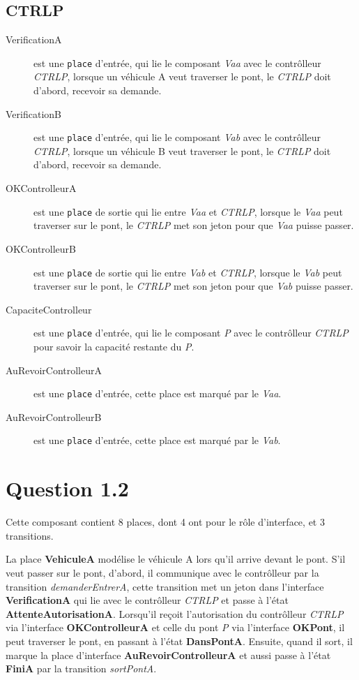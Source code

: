 \documentclass[a4paper,11pt]{report}
\begin{document}
	\subsection{CTRLP}
	\begin{description}
		\item[VerificationA] est une \texttt{place} d'entrée, qui lie le composant \textit{Vaa} avec le contrôlleur \textit{CTRLP}, lorsque un véhicule A veut traverser le pont, le \textit{CTRLP} doit d'abord, recevoir sa demande.
		\item[VerificationB] est une \texttt{place} d'entrée, qui lie le composant \textit{Vab} avec le contrôlleur \textit{CTRLP}, lorsque un véhicule B veut traverser le pont, le \textit{CTRLP} doit d'abord, recevoir sa demande.
		\item[OKControlleurA] est une \texttt{place} de sortie qui lie entre \textit{Vaa} et \textit{CTRLP}, lorsque le \textit{Vaa} peut traverser sur le pont, le \textit{CTRLP} met son jeton pour que \textit{Vaa} puisse passer.
		\item[OKControlleurB] est une \texttt{place} de sortie qui lie entre \textit{Vab} et \textit{CTRLP}, lorsque le \textit{Vab} peut traverser sur le pont, le \textit{CTRLP} met son jeton pour que \textit{Vab} puisse passer.
		\item[CapaciteControlleur] est une \texttt{place} d'entrée, qui lie le composant \textit{P} avec le contrôlleur \textit{CTRLP} pour savoir la capacité restante du \textit{P}.
		\item[AuRevoirControlleurA] est une \texttt{place} d'entrée, cette place est marqué par le \textit{Vaa}.
		\item[AuRevoirControlleurB] est une \texttt{place} d'entrée, cette place est marqué par le \textit{Vab}.
	\end{description}	
	
\section{Question 1.2}
	Cette composant contient 8 places, dont 4 ont pour le rôle d'interface, et 3 transitions.
	
	La place \textbf{VehiculeA} modélise le véhicule A  lors qu'il arrive devant le pont. S'il veut passer sur le pont, d'abord, il communique avec le contrôlleur par la transition \textit{demanderEntrerA}, cette transition met un jeton dans l'interface \textbf{VerificationA} qui lie avec le contrôlleur \textit{CTRLP} et passe à l'état \textbf{AttenteAutorisationA}. Lorsqu'il reçoit l'autorisation du contrôlleur \textit{CTRLP} via l'interface \textbf{OKControlleurA} et celle du pont \textit{P} via l'interface \textbf{OKPont}, il peut traverser le pont, en passant à l'état \textbf{DansPontA}. Ensuite, quand il sort, il marque la place d'interface \textbf{AuRevoirControlleurA} et aussi passe à l'état \textbf{FiniA} par la transition \textit{sortPontA}.
	
\end{document}

